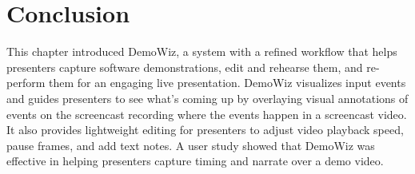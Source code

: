 \section{Conclusion}

This chapter introduced DemoWiz, a system with a refined workflow that helps presenters capture software demonstrations, edit and rehearse them, and re-perform them for an engaging live presentation. DemoWiz visualizes input events and guides presenters to see what's coming up by overlaying visual annotations of events on the screencast recording where the events happen in a screencast video. It also provides lightweight editing for presenters to adjust video playback speed, pause frames, and add text notes. A user study showed that DemoWiz was effective in helping presenters capture timing and narrate over a demo video.
